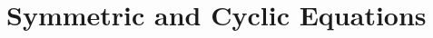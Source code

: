 \documentclass[../../main.tex]{subfiles}
\begin{document}
\section{Symmetric and Cyclic Equations}
\end{document}
